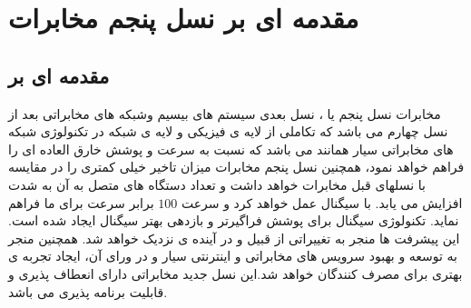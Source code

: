 
\section{  مقدمه ای بر نسل پنجم مخابرات }

\subsection{مقدمه ای بر  }


مخابرات نسل پنجم یا ، نسل بعدی سیستم های بیسیم  وشبکه های مخابراتی بعد از نسل چهارم می باشد که تکاملی از لایه ی فیزیکی و لایه ی شبکه در تکنولوژی شبکه های مخابراتی سیار همانند  می باشد که نسبت به  سرعت و پوشش  خارق العاده ای را فراهم خواهد نمود، همچنین نسل پنجم مخابرات میزان تاخیر خیلی کمتری را در مقایسه با نسلهای قبل مخابرات خواهد داشت و تعداد دستگاه های متصل به آن به شدت افزایش می یابد.   با سیگنال   عمل خواهد کرد و سرعت $100$ برابر سرعت   برای ما فراهم نماید.\newline
تکنولوژی سیگنال   برای پوشش فراگیرتر و بازدهی بهتر سیگنال ایجاد شده است. این پیشرفت ها منجر به تغییراتی از قبیل  و  در آینده ی نزدیک خواهد شد.
همچنین  منجر به توسعه و بهبود سرویس های مخابراتی و اینترنتی سیار و در ورای آن، ایجاد تجربه ی بهتری برای مصرف کنندگان خواهد شد.این نسل جدید مخابراتی دارای انعطاف پذیری و قابلیت برنامه پذیری می باشد.
